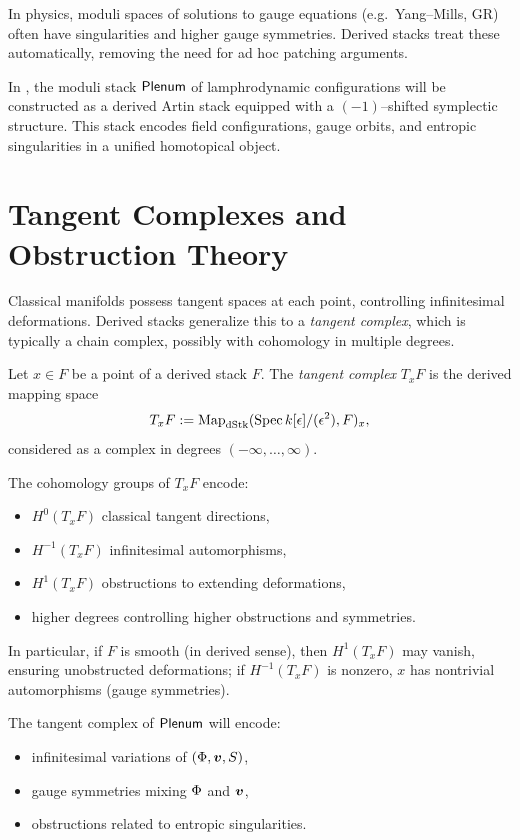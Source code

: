 \Intuition
In physics, moduli spaces of solutions to gauge equations (e.g.\ Yang--Mills,
GR) often have singularities and higher gauge symmetries. Derived stacks treat
these automatically, removing the need for ad hoc patching arguments.

In \rsvpabbr{}, the moduli stack $\mathsf{Plenum}$ of lamphrodynamic configurations
will be constructed as a derived Artin stack equipped with a $(-1)$--shifted
symplectic structure. This stack encodes field configurations, gauge orbits,
and entropic singularities in a unified homotopical object.

\section{Tangent Complexes and Obstruction Theory}

Classical manifolds possess tangent spaces at each point, controlling
infinitesimal deformations. Derived stacks generalize this to a \emph{tangent
complex}, which is typically a chain complex, possibly with cohomology in
multiple degrees.

\begin{definition}
Let $x\in F$ be a point of a derived stack $F$. The \emph{tangent complex}
$T_xF$ is the derived mapping space
\[
  T_xF := \operatorname{Map}_{\mathrm{dStk}}(\operatorname{Spec} k[\epsilon]/(\epsilon^2), F)_x,
\]
considered as a complex in degrees $(-\infty,\dots,\infty)$.
\end{definition}

The cohomology groups of $T_xF$ encode:
\begin{itemize}
  \item $H^0(T_xF)$ classical tangent directions,
  \item $H^{-1}(T_xF)$ infinitesimal automorphisms,
  \item $H^1(T_xF)$ obstructions to extending deformations,
  \item higher degrees controlling higher obstructions and symmetries.
\end{itemize}

In particular, if $F$ is smooth (in derived sense), then $H^1(T_xF)$ may vanish,
ensuring unobstructed deformations; if $H^{-1}(T_xF)$ is nonzero, $x$ has
nontrivial automorphisms (gauge symmetries).

\Intuition
The tangent complex of $\mathsf{Plenum}$ will encode:
\begin{itemize}
  \item infinitesimal variations of $(\Phi,\bm{v},S)$,
  \item gauge symmetries mixing $\Phi$ and $\bm{v}$,
  \item obstructions related to entropic singularities.
\end{itemize}

